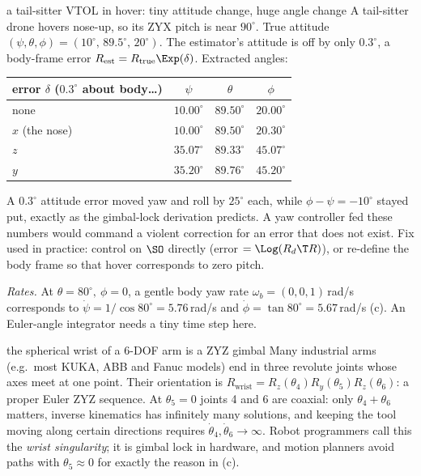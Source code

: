 \begin{example}{a tail-sitter VTOL in hover: tiny attitude change, huge angle change}
A tail-sitter drone hovers nose-up, so its ZYX pitch is near $90^\circ$. True attitude $(\psi,\theta,\phi)=(10^\circ,\,89.5^\circ,\,20^\circ)$. The estimator's attitude is off by only $0.3^\circ$, a body-frame error $R_{\text{est}}=R_{\text{true}}\Exp(\delta)$. Extracted angles:
\begin{center}\small
\begin{tabular}{@{}lccc@{}}\toprule
error $\delta$ ($0.3^\circ$ about body\dots) & $\psi$ & $\theta$ & $\phi$\\\midrule
none & $10.00^\circ$ & $89.50^\circ$ & $20.00^\circ$\\
$x$ (the nose) & $10.00^\circ$ & $89.50^\circ$ & $20.30^\circ$\\
$z$ & $35.07^\circ$ & $89.33^\circ$ & $45.07^\circ$\\
$y$ & $35.20^\circ$ & $89.76^\circ$ & $45.20^\circ$\\\bottomrule
\end{tabular}
\end{center}
A $0.3^\circ$ attitude error moved yaw and roll by $25^\circ$ each, while $\phi-\psi=-10^\circ$ stayed put, exactly as the gimbal-lock derivation predicts. A yaw controller fed these numbers would command a violent correction for an error that does not exist. Fix used in practice: control on $\SO$ directly (error $=\Log(R_d\T R)$), or re-define the body frame so that hover corresponds to zero pitch.

\emph{Rates.} At $\theta=80^\circ,\ \phi=0$, a gentle body yaw rate $\omega_b=(0,0,1)$\,rad/s corresponds to $\dot\psi=1/\cos80^\circ=5.76$\,rad/s and $\dot\phi=\tan80^\circ=5.67$\,rad/s (c). An Euler-angle integrator needs a tiny time step here.
\end{example}

\begin{example}{the spherical wrist of a 6-DOF arm is a ZYZ gimbal}\label{sec:rot:wrist}
Many industrial arms (e.g.\ most KUKA, ABB and Fanuc models) end in three revolute joints whose axes meet at one point. Their orientation is $R_{\text{wrist}}=R_z(\theta_4)R_y(\theta_5)R_z(\theta_6)$: a proper Euler ZYZ sequence. At $\theta_5=0$ joints 4 and 6 are coaxial: only $\theta_4+\theta_6$ matters, inverse kinematics has infinitely many solutions, and keeping the tool moving along certain directions requires $\dot\theta_4,\dot\theta_6\to\infty$. Robot programmers call this the \emph{wrist singularity}; it is gimbal lock in hardware, and motion planners avoid paths with $\theta_5\approx0$ for exactly the reason in (c).
\end{example}
